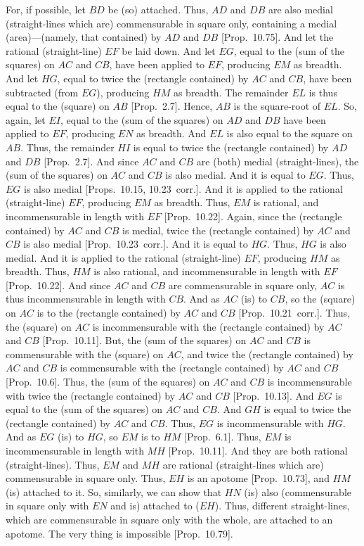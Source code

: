 For, if possible, let $BD$ be (so) attached. Thus, $AD$ and $DB$ are also medial (straight-lines which
are) commensurable in square only, containing a medial (area)---(namely,
that contained) by $AD$ and $DB$ [Prop.~10.75].
And let the rational (straight-line) $EF$ be laid down. And let $EG$,
equal to the (sum of the squares) on $AC$ and $CB$, have been applied
to $EF$, producing $EM$ as breadth. And let $HG$, equal to twice
the (rectangle contained) by $AC$ and $CB$, have been subtracted
(from $EG$), producing $HM$ as breadth. The remainder $EL$ is
thus equal to the (square) on $AB$ [Prop.~2.7]. 
Hence, $AB$ is the square-root of $EL$. So, again, let $EI$, equal to
the (sum of the squares) on $AD$ and $DB$ have been applied to $EF$,
producing $EN$ as breadth. And $EL$ is also equal to the square
on $AB$. Thus, the remainder 
$HI$ is equal to twice the (rectangle contained) by $AD$ and $DB$ [Prop.~2.7]. And since $AC$ and $CB$ are
(both) medial (straight-lines), the (sum of the squares) on $AC$ and $CB$ is also medial.
And it is equal to $EG$. Thus, $EG$ is also medial [Props.~10.15, 10.23~corr.]. And it is
applied to the rational (straight-line) $EF$, producing $EM$ as breadth.
Thus, $EM$ is rational, and incommensurable in length with $EF$
[Prop.~10.22]. Again, since the (rectangle
contained) by $AC$ and $CB$ is medial, twice the (rectangle
contained) by $AC$ and $CB$ is also medial [Prop.~10.23~corr.]. And it is equal to $HG$.
Thus, $HG$ is also medial. And it is applied to the rational (straight-line)
$EF$, producing $HM$ as breadth. Thus, $HM$ is also rational, and
incommensurable in length with $EF$ [Prop.~10.22]. And since $AC$ and $CB$ are commensurable in square only, $AC$ is thus incommensurable in length with $CB$.  And as $AC$ (is)
to $CB$, so the (square) on $AC$
is to the (rectangle contained) by $AC$ and $CB$ [Prop.~10.21~corr.]. Thus, the (square) on $AC$
is incommensurable with the (rectangle contained) by $AC$ and $CB$
[Prop.~10.11].
But, the (sum of the squares) on $AC$ and $CB$ is commensurable
with the (square) on $AC$, and twice the (rectangle contained) by $AC$ and
$CB$ is commensurable with the (rectangle contained) by $AC$ and $CB$ [Prop.~10.6].
Thus, the (sum of the squares) on $AC$ and $CB$ is incommensurable
with twice the (rectangle contained) by $AC$ and $CB$ [Prop.~10.13]. And $EG$ is equal to
the (sum of the squares) on $AC$ and $CB$. And $GH$ is equal
to twice the (rectangle contained) by $AC$ and $CB$. Thus, 
$EG$ is incommensurable with $HG$. And as $EG$ (is) to $HG$,
so $EM$ is to $HM$ [Prop.~6.1]. 
Thus, $EM$ is incommensurable in length with $MH$ [Prop.~10.11]. And they are both rational (straight-lines).
Thus, $EM$ and $MH$ are rational (straight-lines which are)
commensurable in square only. Thus, $EH$ is an apotome
[Prop.~10.73], and $HM$ (is) attached to
it. So, similarly, we can show that $HN$ (is) also (commensurable
in square only with $EN$ and is) attached to ($EH$). 
Thus, different straight-lines, which are commensurable
in square only with the whole, are attached to an apotome.
The very thing is impossible [Prop.~10.79].

